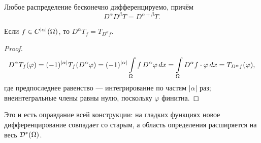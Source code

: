 \begin{corollary}
Любое распределение бесконечно дифференцируемо, причём
\[
  D^\alpha D^\beta T = D^{\alpha + \beta} T .
\]
\end{corollary}

\begin{proposition}\label{prop:deriv-classic}
Если $f \in C^{|\alpha|}(\Omega)$, то $D^\alpha T_f = T_{D^\alpha f}$.
\end{proposition}

\begin{proof}
\[
  D^\alpha T_f(\varphi) = (-1)^{|\alpha|} T_f(D^\alpha \varphi)
  = (-1)^{|\alpha|} \int\limits_\Omega f\, D^\alpha \varphi\, dx
  = \int\limits_\Omega D^\alpha f \cdot \varphi\, dx = T_{D^\alpha f}(\varphi) ,
\]
где предпоследнее равенство — интегрирование по частям $|\alpha|$ раз; внеинтегральные
члены равны нулю, поскольку $\varphi$ финитна.
\end{proof}

\begin{idea}
Это и есть оправдание всей конструкции: на гладких функциях новое дифференцирование
совпадает со старым, а область определения расширяется на весь $\mathcal{D}^*(\Omega)$.
\end{idea}
